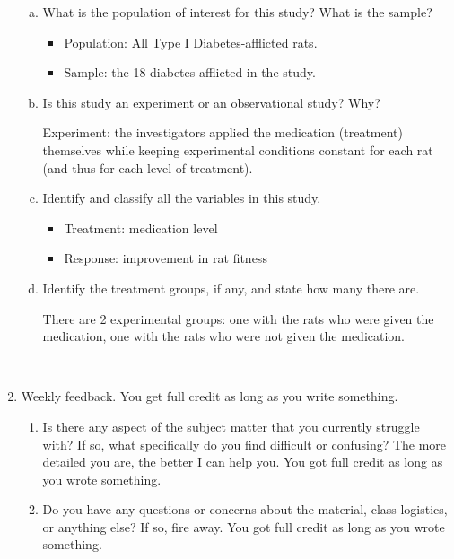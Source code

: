 \documentclass{article}\usepackage{graphicx, color}
\providecommand{\q}{$\quad$ \newline}
\numberwithin{equation}{section}
\begin{document}
\begin{flushleft}
\begin{enumerate}[1. ]
\begin{enumerate}[a. ]
\item What is the population of interest for this study? What is the sample? 

\begin{itemize}
\item {\color{red} Population: All Type I Diabetes-afflicted rats. }
\item {\color{red} Sample: the 18 diabetes-afflicted in the study.}
\end{itemize}


\item Is this study an experiment or an observational study? Why? \q

{\color{red} Experiment: the investigators applied the medication (treatment) themselves while keeping experimental conditions constant for each rat (and thus for each level of treatment).} \q

\item Identify and classify all the variables in this study.

{\color{red}
\begin{itemize}
\item Treatment: medication level
\item Response: improvement in rat fitness 
\end{itemize}}

\item Identify the treatment groups, if any, and state how many there are. \q

{\color{red} There are 2 experimental groups: one with the rats who were given the medication, one with the rats who were not given the medication. }

\end{enumerate} \q

\item Weekly feedback. You get full credit as long as you write something.
\begin{enumerate}[1. ]
\item Is there any aspect of the subject matter that you currently struggle with? If so, what specifically do you find difficult or confusing? The more detailed you are, the better I can help you.
{\color{red} You got full credit as long as you wrote something.}
\item Do you have any questions or concerns about the material, class logistics, or anything else? If so, fire away.
{\color{red} You got full credit as long as you wrote something.}
\end{enumerate}

\end{enumerate}




\end{flushleft}
% 
%
\end{document}
